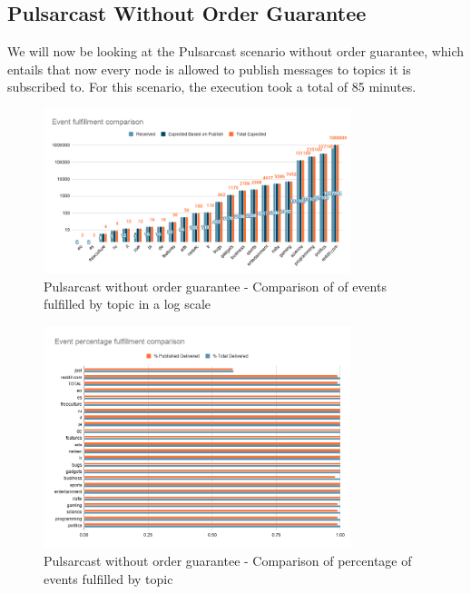 \subsection{Pulsarcast Without Order Guarantee}\label{subsec:pulsarcast-without-order-guarantee}

We will now be looking at the Pulsarcast scenario without order guarantee,
which entails that now every node is allowed to publish messages to topics it
is subscribed to. For this scenario, the execution took a total of 85 minutes.

\begin{figure}[!htb]
  \centering
  \includegraphics[width=0.8\textwidth]{img/graph-pulsarcast-event-fulfillment-comparison.png}
  \caption{Pulsarcast without order guarantee - Comparison of of events fulfilled by topic in a log scale}
  \label{fig:graph-pulsarcast-event-fulfillment-comparison}
\end{figure}

\begin{figure}[!htb]
  \centering
  \includegraphics[width=0.8\textwidth]{img/graph-pulsarcast-event-percentage-fulfillment-comparison.png}
  \caption{Pulsarcast without order guarantee - Comparison of percentage of events fulfilled by topic}
  \label{fig:graph-pulsarcast-event-percentage-fulfillment-comparison}
\end{figure}

